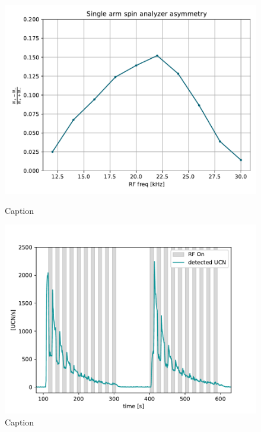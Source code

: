 \begin{figure}
\centering
\begin{minipage}{.5\textwidth}
    \centering
    \includegraphics[width=\textwidth]{figures/single_arm_asymmetry_2021.pdf}
    \caption
    {Caption}
    \label{fig:2021_west_single_arm_asymmetry}
\end{minipage}%
\begin{minipage}{.5\textwidth}
    \centering
    \includegraphics[width=\textwidth]{figures/2021_roundhouse_rf_toggle.pdf}
    \caption
    {Caption}
    \label{fig:roundhouse_rf_toggle_doublet}
\end{minipage}
\end{figure}

